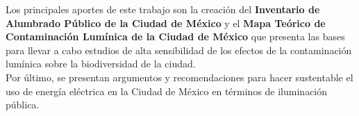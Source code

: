 Los principales aportes de este trabajo son la creación del \textbf{Inventario de Alumbrado Público de la Ciudad de México} y el \textbf{Mapa Teórico de Contaminación Lumínica de la Ciudad de México} que presenta las bases para llevar a cabo estudios de alta sensibilidad de los efectos de la contaminación lumínica sobre la biodiversidad de la ciudad.\\

Por último, se presentan argumentos y recomendaciones para hacer sustentable el uso de energía eléctrica en la Ciudad de México en términos de iluminación pública.\\
